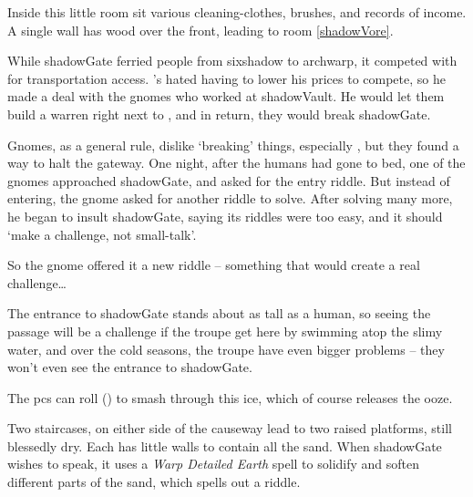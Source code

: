 \begin{multicols}{2}

Inside this little room sit various cleaning-clothes, brushes, and records of income.
A single wall has wood over the front, leading to room \vref{shadowVore}.



\begin{exampletext}
  While \gls{shadowGate} ferried people from \gls{sixshadow} to \gls{archwarp}, it competed with  for transportation access.
  's  hated having to lower his prices to compete, so he made a deal with the gnomes who worked at \gls{shadowVault}.
  He would let them build a warren right next to , and in return, they would break \gls{shadowGate}.

  Gnomes, as a general rule, dislike `breaking' things, especially , but they found a way to halt the gateway.
  One night, after the humans had gone to bed, one of the gnomes approached \gls{shadowGate}, and asked for the entry riddle.
  But instead of entering, the gnome asked for another riddle to solve.
  After solving many more, he began to insult \gls{shadowGate}, saying its riddles were too easy, and it should `make a challenge, not small-talk'.

  So the gnome offered it a new riddle -- something that would create a real challenge\ldots
\end{exampletext}

The entrance to \gls{shadowGate} stands about as tall as a human, so seeing the passage will be a challenge if the troupe get here by swimming atop the slimy water, and over the cold seasons, the troupe have even bigger problems -- they won't even see the entrance to \gls{shadowGate}.

The \glspl{pc} can roll  (\tn[10]) to smash through this ice, which of course releases the ooze.

Two staircases, on either side of the causeway lead to two raised platforms, still blessedly dry.
Each has little walls to contain all the sand.
When \gls{shadowGate} wishes to speak, it uses a \textit{Warp Detailed Earth} spell to solidify and soften different parts of the sand, which spells out a riddle.


\end{multicols}
